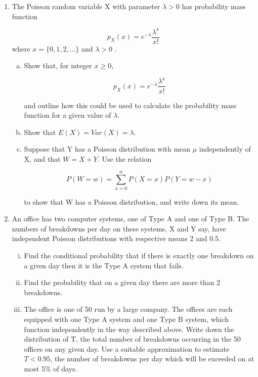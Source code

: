\documentclass[a4paper,12pt]{article}
\begin{document}
\begin{enumerate}
\item The Poisson random variable X with parameter $\lambda > 0$ has probability mass function

\[{\displaystyle p_X(x) =e^{-\lambda }{\frac {\lambda ^{x}}{x!}}}\] where
$ x = \{0, 1, 2, \ldots\}$ and $\lambda>0$ .

\begin{enumerate}[(a)]
\item Show that, for integer $x \geq 0$,

\[{\displaystyle p_X(x) =e^{-\lambda }{\frac {\lambda ^{x}}{x!}}}\]

and outline how this could be used to calculate the probability mass function for a given value of $\lambda$.



\item Show that $E(X) = Var(X) = \lambda$.



\item Suppose that Y has a Poisson distribution with mean $\mu$ independently of X, and that $W = X +Y$. Use the relation

\[ P(W=w) =  \sum^{n}_{x=0} P(X=x) P(Y=w-x) \]

to show that W has a Poisson distribution, and write down its mean.
\end{enumerate}

\item An office has two computer systems, one of Type A and one of Type B. The numbers of breakdowns per day on these systems, X and Y say, have independent Poisson distributions with respective means 2 and 0.5.
\begin{enumerate}[(i)]
\item Find the conditional probability that if there is exactly one breakdown on a given day then it is the Type A system that fails.
\item Find the probability that on a given day there are more than 2 breakdowns.
\item The office is one of 50 run by a large company. The offices are each equipped with one Type A system and one Type B system, which function independently in the way described above. Write down the distribution of T, the total number of breakdowns occurring in the 50 offices on any given day. Use a suitable approximation to estimate $T<0.95$, the number of breakdowns per day which will be exceeded on at most 5\% of days.



\end{enumerate}
\end{enumerate}
\end{document}
